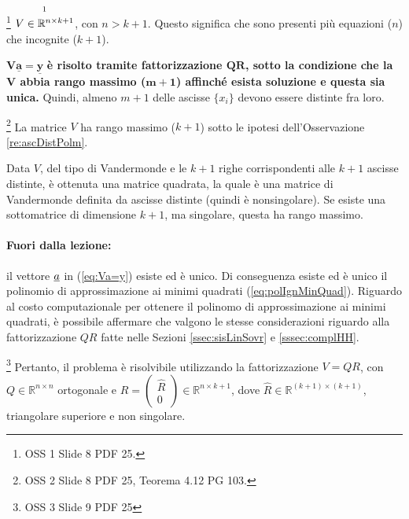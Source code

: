 \begin{remark}
    \footnote{OSS 1 Slide 8 PDF 25.}
    $\overset{\footnotemark}{V\in\mathbb R^{n\times k+1}}$, con $n>k+1$. Questo significa che sono presenti più equazioni ($n$) che incognite ($k+1$).
\end{remark}

$\boldsymbol{V\underline{a}=\underline{y}}$ \textbf{è risolto tramite fattorizzazione $\boldsymbol{QR}$, sotto la condizione che la $\boldsymbol V$ abbia rango massimo ($\boldsymbol{m+1}$) affinché esista soluzione e questa sia unica.} Quindi, almeno $m+1$ delle ascisse $\{x_i\}$ devono essere distinte fra loro.

\begin{remark}
    \footnote{OSS 2 Slide 8 PDF 25, Teorema 4.12 PG 103.}
    La matrice $V$ ha rango massimo ($k+1$) sotto le ipotesi dell'Osservazione \ref{re:ascDistPolm}.
\end{remark}

Data $V$, del tipo di Vandermonde e le $k+1$ righe corrispondenti alle $k+1$ ascisse distinte, è ottenuta una matrice quadrata, la quale è una matrice di Vandermonde definita da ascisse distinte (quindi è nonsingolare). Se esiste una sottomatrice di dimensione $k+1$, ma singolare, questa ha rango massimo.

\paragraph{Fuori dalla lezione:} il vettore $\uline a$ in (\ref{eq:Va=y}) esiste ed è unico. Di conseguenza esiste ed è unico il polinomio di approssimazione ai minimi quadrati (\ref{eq:polIgnMinQuad}). Riguardo al costo computazionale per ottenere il polinomo di approssimazione ai minimi quadrati, è possibile affermare che valgono le stesse considerazioni riguardo alla fattorizzazione $QR$ fatte nelle Sezioni \ref{ssec:sisLinSovr} e \ref{sssec:complHH}.

\begin{remark}
    \footnote{OSS 3 Slide 9 PDF 25} Pertanto, il problema è risolvibile utilizzando la fattorizzazione $V=QR$, con $Q\in\mathbb R^{n\times n}$ ortogonale e $R=\begin{pmatrix}\widehat R\\ 0\end{pmatrix}\in\mathbb R^{n\times k+1}$, dove $\widehat R\in\mathbb R^{(k+1)\times (k+1)}$, triangolare superiore e non singolare.
\end{remark}

